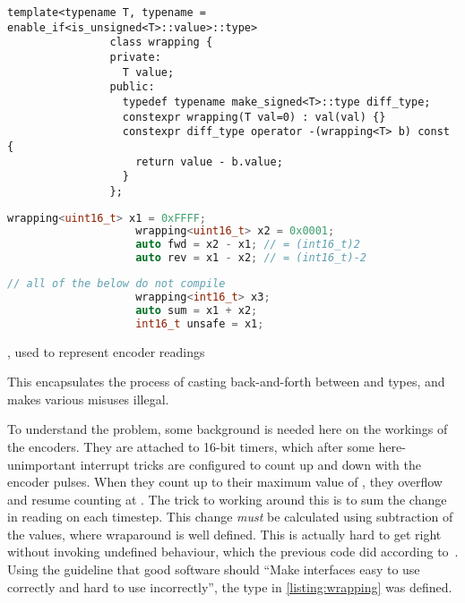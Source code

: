\documentclass[main.tex]{subfiles}
\begin{document}
		\begin{listingfloat}[b!]
			\begin{lstlisting}[language={[11]c++},frame=single,gobble=8]
				template<typename T, typename = enable_if<is_unsigned<T>::value>::type>
				class wrapping {
				private:
				  T value;
				public:
				  typedef typename make_signed<T>::type diff_type;
				  constexpr wrapping(T val=0) : val(val) {}
				  constexpr diff_type operator -(wrapping<T> b) const {
				    return value - b.value;
				  }
				};
			\end{lstlisting}%
			\begin{minipage}[t]{0.5\linewidth-1em}
				\begin{lstlisting}[language=c++,frame=single,gobble=10]
					wrapping<uint16_t> x1 = 0xFFFF;
					wrapping<uint16_t> x2 = 0x0001;
					auto fwd = x2 - x1; // = (int16_t)2
					auto rev = x1 - x2; // = (int16_t)-2
				\end{lstlisting}
			\end{minipage}\hfill
			\begin{minipage}[t]{0.5\linewidth-1em}
				\begin{lstlisting}[language=c++,frame=single,gobble=10]
					// all of the below do not compile
					wrapping<int16_t> x3;
					auto sum = x1 + x2;
					int16_t unsafe = x1;
				\end{lstlisting}
			\end{minipage}\hfill
			\caption{, used to represent encoder readings}
			\label{listing:wrapping}
			\medskip
			\small
			This encapsulates the process of casting back-and-forth between  and  types, and makes various misuses illegal.
		\end{listingfloat}

		To understand the problem, some background is needed here on the workings of the encoders.
		They are attached to 16-bit timers, which after some here-unimportant interrupt tricks are configured to count up and down with the encoder pulses. When they count up to their maximum value of , they overflow and resume counting at .
		The trick to working around this is to sum the change in reading on each timestep. This change \emph{must} be calculated using  subtraction of the values, where wraparound is well defined. This is actually hard to get right without invoking undefined behaviour, which the previous code did according to~\cite[Paragraph~5/4]{cpp-standard}.
		Using the guideline that good software should \enquote{Make interfaces easy to use correctly and hard to use incorrectly}\cite{meyers2004most}, the type in \cref{listing:wrapping} was defined.
\end{document}
